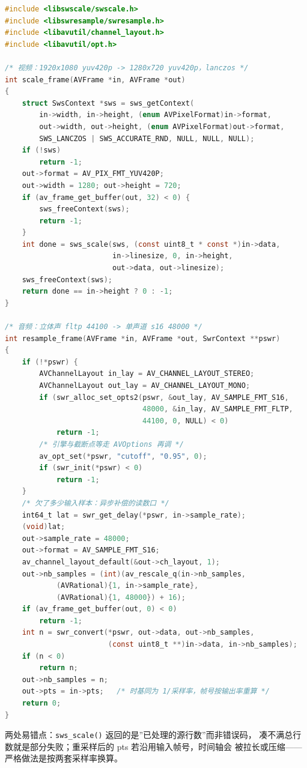 \documentclass[12pt,a4paper,fontset=fandol]{ctexbook}
\newcommand{\Fn}[1]{\texttt{#1()}}
\begin{document}
\begin{lstlisting}[style=cstyle,language=C,
  caption={sws 缩放一帧与 swr 重采样一帧的组合用法},
  label={lst:ch09-swsswr}]
#include <libswscale/swscale.h>
#include <libswresample/swresample.h>
#include <libavutil/channel_layout.h>
#include <libavutil/opt.h>

/* 视频：1920x1080 yuv420p -> 1280x720 yuv420p，lanczos */
int scale_frame(AVFrame *in, AVFrame *out)
{
    struct SwsContext *sws = sws_getContext(
        in->width, in->height, (enum AVPixelFormat)in->format,
        out->width, out->height, (enum AVPixelFormat)out->format,
        SWS_LANCZOS | SWS_ACCURATE_RND, NULL, NULL, NULL);
    if (!sws)
        return -1;
    out->format = AV_PIX_FMT_YUV420P;
    out->width = 1280; out->height = 720;
    if (av_frame_get_buffer(out, 32) < 0) {
        sws_freeContext(sws);
        return -1;
    }
    int done = sws_scale(sws, (const uint8_t * const *)in->data,
                         in->linesize, 0, in->height,
                         out->data, out->linesize);
    sws_freeContext(sws);
    return done == in->height ? 0 : -1;
}

/* 音频：立体声 fltp 44100 -> 单声道 s16 48000 */
int resample_frame(AVFrame *in, AVFrame *out, SwrContext **pswr)
{
    if (!*pswr) {
        AVChannelLayout in_lay = AV_CHANNEL_LAYOUT_STEREO;
        AVChannelLayout out_lay = AV_CHANNEL_LAYOUT_MONO;
        if (swr_alloc_set_opts2(pswr, &out_lay, AV_SAMPLE_FMT_S16,
                                48000, &in_lay, AV_SAMPLE_FMT_FLTP,
                                44100, 0, NULL) < 0)
            return -1;
        /* 引擎与截断点等走 AVOptions 再调 */
        av_opt_set(*pswr, "cutoff", "0.95", 0);
        if (swr_init(*pswr) < 0)
            return -1;
    }
    /* 欠了多少输入样本：异步补偿的读数口 */
    int64_t lat = swr_get_delay(*pswr, in->sample_rate);
    (void)lat;
    out->sample_rate = 48000;
    out->format = AV_SAMPLE_FMT_S16;
    av_channel_layout_default(&out->ch_layout, 1);
    out->nb_samples = (int)(av_rescale_q(in->nb_samples,
            (AVRational){1, in->sample_rate},
            (AVRational){1, 48000}) + 16);
    if (av_frame_get_buffer(out, 0) < 0)
        return -1;
    int n = swr_convert(*pswr, out->data, out->nb_samples,
                        (const uint8_t **)in->data, in->nb_samples);
    if (n < 0)
        return n;
    out->nb_samples = n;
    out->pts = in->pts;   /* 时基同为 1/采样率，帧号按输出率重算 */
    return 0;
}
\end{lstlisting}

两处易错点：\Fn{sws\_scale} 返回的是''已处理的源行数''而非错误码，
凑不满总行数就是部分失败；重采样后的 pts 若沿用输入帧号，时间轴会
被拉长或压缩——严格做法是按两套采样率换算。
\end{document}
